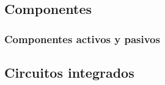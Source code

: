 \documentclass{beamer}
\begin{document}
\begin{frame}
\frametitle{}

\end{frame}

\subsection{Componentes}
\begin{frame}
\frametitle{Componentes activos y pasivos}

\end{frame}

\subsection{Circuitos integrados}

\begin{frame}
\frametitle{}

\end{frame}
\end{document}
